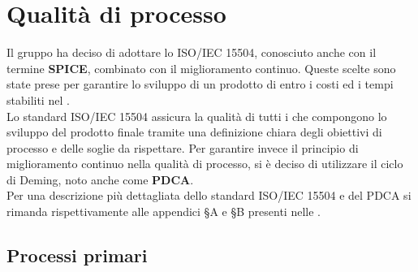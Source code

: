 \section{Qualità di processo}
\label{qualità_processo}
Il gruppo {\Gruppo} ha deciso di adottare lo  ISO/IEC 15504, conosciuto anche con il termine \textbf{SPICE}, combinato con il miglioramento continuo. Queste scelte sono state prese per garantire lo sviluppo di un prodotto di  entro i costi ed i tempi stabiliti nel \PdP{}.\\
Lo standard ISO/IEC 15504 assicura la qualità di tutti i  che compongono lo sviluppo del prodotto finale tramite una definizione chiara degli obiettivi di processo e delle soglie da rispettare. Per garantire invece il principio di miglioramento continuo nella qualità di processo, si è deciso di utilizzare il ciclo di Deming, noto anche come \textbf{PDCA}.\\
Per una descrizione più dettagliata dello standard ISO/IEC 15504 e del PDCA si rimanda rispettivamente alle appendici \S{A} e \S{B} presenti nelle .
\subsection{Processi primari}
